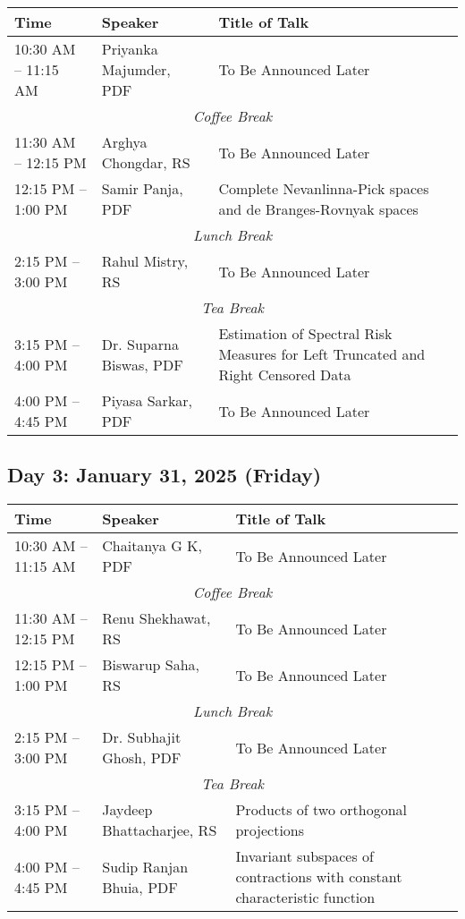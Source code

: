 \noindent
\renewcommand{\arraystretch}{1.5} %
\begin{tabular}{|p{3.5cm}|p{4cm}|p{7cm}|}
	\hline
	\textbf{Time} & \textbf{Speaker} & \textbf{Title of Talk} \\
	\hline
	10:30 AM -- 11:15 AM & Priyanka Majumder, PDF & To Be Announced Later \\
	\hline
	\multicolumn{3}{|c|}{\textit{Coffee Break}} \\
	\hline
	11:30 AM -- 12:15 PM & Arghya Chongdar, RS & To Be Announced Later \\
	\hline
	12:15 PM -- 1:00 PM & Samir Panja, PDF & Complete Nevanlinna-Pick spaces and de Branges-Rovnyak spaces \\
	\hline
	\multicolumn{3}{|c|}{\textit{Lunch Break}} \\
	\hline
	2:15 PM -- 3:00 PM & Rahul Mistry, RS & To Be Announced Later \\
	\hline
	\multicolumn{3}{|c|}{\textit{Tea Break}} \\
	\hline
	3:15 PM -- 4:00 PM & Dr. Suparna Biswas, PDF &  Estimation of Spectral Risk Measures for Left Truncated and Right Censored Data  \\
	\hline
	4:00 PM -- 4:45 PM & Piyasa Sarkar, PDF & To Be Announced Later \\
	\hline

\end{tabular}

\subsection*{Day 3: January 31, 2025 (Friday)}

\noindent
\renewcommand{\arraystretch}{1.5} %
\begin{tabular}{|p{3.5cm}|p{4cm}|p{7cm}|}
	\hline
	\textbf{Time} & \textbf{Speaker} & \textbf{Title of Talk} \\
	\hline
	10:30 AM -- 11:15 AM & Chaitanya G K, PDF & To Be Announced Later \\
	\hline
	\multicolumn{3}{|c|}{\textit{Coffee Break}} \\
	\hline
	11:30 AM -- 12:15 PM & Renu Shekhawat, RS & To Be Announced Later \\
	\hline
	12:15 PM -- 1:00 PM & Biswarup Saha, RS & To Be Announced Later \\
	\hline
	\multicolumn{3}{|c|}{\textit{Lunch Break}} \\
	\hline
	2:15 PM -- 3:00 PM & Dr. Subhajit Ghosh, PDF & To Be Announced Later \\
	\hline
	\multicolumn{3}{|c|}{\textit{Tea Break}} \\
	\hline
	3:15 PM -- 4:00 PM &  Jaydeep Bhattacharjee, RS & Products of two orthogonal projections \\
	\hline

	4:00 PM -- 4:45 PM & Sudip Ranjan Bhuia, PDF & Invariant subspaces of contractions with constant characteristic function \\
	\hline
\end{tabular}
